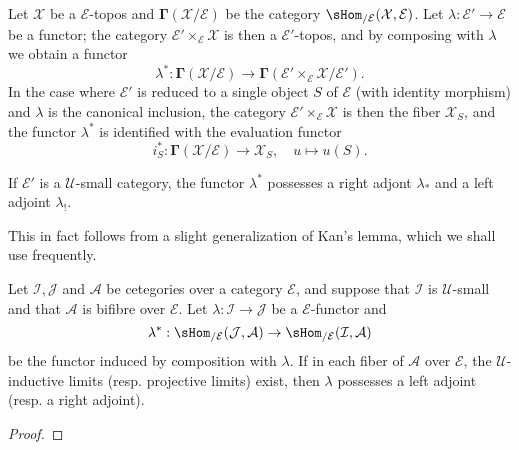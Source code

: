 Let $\mathcal{X}$ be a $\mathcal{E}$-topos and $\bm{\Gamma}(\mathcal{X}/\mathcal{E})$ be the category $\sHom_{/\mathcal{E}}(\mathcal{X},\mathcal{E})$. Let $\lambda:\mathcal{E}'\to \mathcal{E}$ be a functor; the category $\mathcal{E}'\times_\mathcal{E}\mathcal{X}$ is then a $\mathcal{E}'$-topos, and by composing with $\lambda$ we obtain a functor
\[\lambda^*:\bm{\Gamma}(\mathcal{X}/\mathcal{E})\to \bm{\Gamma}(\mathcal{E}'\times_\mathcal{E}\mathcal{X}/\mathcal{E}').\]
In the case where $\mathcal{E}'$ is reduced to a single object $S$ of $\mathcal{E}$ (with identity morphism) and $\lambda$ is the canonical inclusion, the category $\mathcal{E}'\times_\mathcal{E}\mathcal{X}$ is then the fiber $\mathcal{X}_S$, and the functor $\lambda^*$ is identified with the evaluation functor
\begin{equation}\label{topos fibre evaluation functor def}
i_S^*:\bm{\Gamma}(\mathcal{X}/\mathcal{E})\to \mathcal{X}_S,\quad u\mapsto u(S).
\end{equation}

\begin{proposition}\label{topos fibre inverse image on section adjoint exist}
If $\mathcal{E}'$ is a $\mathscr{U}$-small category, the functor $\lambda^*$ possesses a right adjont $\lambda_*$ and a left adjoint $\lambda_!$. 
\end{proposition} 
This in fact follows from a slight generalization of Kan's lemma, which we shall use frequently.
\begin{lemma}\label{fibre cat pullback on Hom adjoint exist lemma}
Let $\mathcal{I},\mathcal{J}$ and $\mathcal{A}$ be cetegories over a category $\mathcal{E}$, and suppose that $\mathcal{I}$ is $\mathscr{U}$-small and that $\mathcal{A}$ is bifibre over $\mathcal{E}$. Let $\lambda:\mathcal{I}\to \mathcal{J}$ be a $\mathcal{E}$-functor and
\[\lambda^*:\sHom_{/\mathcal{E}}(\mathcal{J},\mathcal{A})\to \sHom_{/\mathcal{E}}(\mathcal{I},\mathcal{A})\]
be the functor induced by composition with $\lambda$. If in each fiber of $\mathcal{A}$ over $\mathcal{E}$, the $\mathscr{U}$-inductive limits (resp. projective limits) exist, then $\lambda$ possesses a left adjoint (resp. a right adjoint).
\end{lemma}
\begin{proof}

\end{proof}

